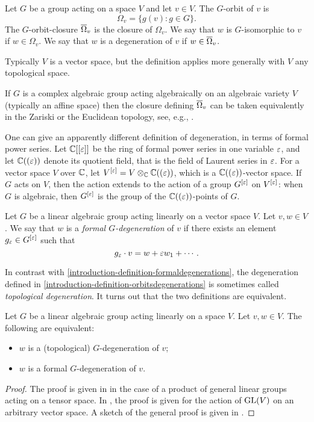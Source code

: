 \begin{definition}
\label{introduction-definition-orbitsdegenerations}
Let $G$ be a group acting on a space $V$ and let $v \in V$. The $G$-orbit of $v$ is 
\[
\Omega_v = \{ g(v) : g \in G \}.
\]
The $G$-orbit-closure $\overline{\Omega}_v$ is the closure of $\Omega_v$. We say that $w$ is $G$-isomorphic to $v$ if $w \in \Omega_v$. We say that $w$ is a degeneration of $v$ if $w \in \overline{\Omega}_v$.

Typically $V$ is a vector space, but the definition applies more generally with $V$ any topological space.
\end{definition}

If $G$ is a complex algebraic group acting algebraically on an algebraic variety $V$ (typically an affine space) then the closure defining $\overline{\Omega}_v$ can be taken equivalently in the Zariski or the Euclidean topology, see, e.g., \cite[Thm. 2.33]{Mum76}.

One can give an apparently different definition of degeneration, in terms of formal power series. Let $\mathbb{C}[[\varepsilon]]$ be the ring of formal power series in one variable $\varepsilon$, and let $\mathbb{C}((\varepsilon))$ denote its quotient field, that is the field of Laurent series in $\varepsilon$. For a vector space $V$ over $\mathbb{C}$, let $V^{[\varepsilon]} = V \otimes_{\mathbb{C}} \mathbb{C}((\varepsilon))$, which is a $\mathbb{C}((\varepsilon))$-vector space. If $G$ acts on $V$, then the action extends to the action of a group $G^{[\varepsilon]}$ on $V^{[\varepsilon]}$: when $G$ is algebraic, then $G^{[\varepsilon]}$ is the group of the $\mathbb{C}((\varepsilon))$-points of $G$. 
\begin{definition}
\label{introduction-definition-formaldegenerations}
Let $G$ be a linear algebraic group acting linearly on a vector space $V$. Let $v,w \in V$. We say that $w$ is a \emph{formal $G$-degeneration} of $v$ if there exists an element $g_\varepsilon \in G^{[\varepsilon]}$ such that
\[
g_\varepsilon \cdot v = w + \varepsilon w_1 + \cdots .
\]
\end{definition}
In contrast with \ref{introduction-definition-formaldegenerations}, the degeneration defined in \ref{introduction-definition-orbitsdegenerations} is sometimes called \emph{topological degeneration}. It turns out that the two definitions are equivalent.
\begin{theorem}
\label{introduction-theorem-degenerationsequivalence}
Let $G$ be a linear algebraic group acting linearly on a space $V$. Let $v,w \in V$. The following are equivalent:
\begin{itemize}
 \item $w$ is a (topological) $G$-degeneration of $v$;
 \item $w$ is a formal $G$-degeneration of $v$.
\end{itemize}
\end{theorem}
\begin{proof}
The proof is given in \cite[Sec.20.6]{BCS97} in the case of a product of general linear groups acting on a tensor space. In \cite[Sec.2.3]{Kra84}, the proof is given for the action of $\mathrm{GL}(V)$ on an arbitrary vector space. A sketch of the general proof is given in \cite[Rmk.4.4]{CGZ23}.
\end{proof}

